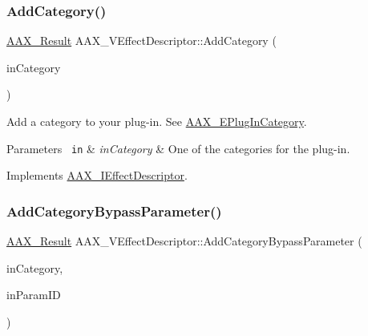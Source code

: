 \subsubsection{\texorpdfstring{AddCategory()}{AddCategory()}}
{\footnotesize\ttfamily \mbox{\hyperlink{a00392_a4d8f69a697df7f70c3a8e9b8ee130d2f}{A\+A\+X\+\_\+\+Result}} A\+A\+X\+\_\+\+V\+Effect\+Descriptor\+::\+Add\+Category (\begin{DoxyParamCaption}\item[{uint32\+\_\+t}]{in\+Category }\end{DoxyParamCaption})\hspace{0.3cm}{\ttfamily [virtual]}}



Add a category to your plug-\/in. See \mbox{\hyperlink{a00491_aef9637518fb1ac0e2f403444c73aba4a}{A\+A\+X\+\_\+\+E\+Plug\+In\+Category}}. 


\begin{DoxyParams}[1]{Parameters}
\mbox{\texttt{ in}}  & {\em in\+Category} & One of the categories for the plug-\/in. \\
\hline
\end{DoxyParams}


Implements \mbox{\hyperlink{a01813_aeb6683e6758f7eb00f87c153e4809641}{A\+A\+X\+\_\+\+I\+Effect\+Descriptor}}.

\mbox{\label{a01913_aad0c7c9de79b6c812befd0860cc16cc5}} 
\subsubsection{\texorpdfstring{AddCategoryBypassParameter()}{AddCategoryBypassParameter()}}
{\footnotesize\ttfamily \mbox{\hyperlink{a00392_a4d8f69a697df7f70c3a8e9b8ee130d2f}{A\+A\+X\+\_\+\+Result}} A\+A\+X\+\_\+\+V\+Effect\+Descriptor\+::\+Add\+Category\+Bypass\+Parameter (\begin{DoxyParamCaption}\item[{uint32\+\_\+t}]{in\+Category,  }\item[{\mbox{\hyperlink{a00392_a1440c756fe5cb158b78193b2fc1780d1}{A\+A\+X\+\_\+\+C\+Param\+ID}}}]{in\+Param\+ID }\end{DoxyParamCaption})\hspace{0.3cm}{\ttfamily [virtual]}}



